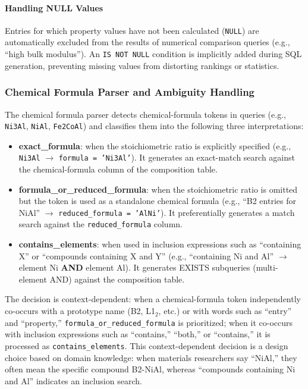 \documentclass[5p,twocolumn]{elsarticle}
\begin{document}
\paragraph{Handling NULL Values}
Entries for which property values have not been calculated (\texttt{NULL})
are automatically excluded from the results of numerical comparison queries
(e.g., ``high bulk modulus'').
An \texttt{IS NOT NULL} condition is implicitly added during SQL generation,
preventing missing values from distorting rankings or statistics.

\subsubsection{Chemical Formula Parser and Ambiguity Handling}
\label{sec:formula_parser}

The chemical formula parser detects chemical-formula tokens in queries (e.g., \texttt{Ni3Al}, \texttt{NiAl},
\texttt{Fe2CoAl}) and classifies them into the following three interpretations:

\begin{itemize}
  \item \textbf{exact\_formula}: when the stoichiometric ratio is explicitly specified
    (e.g., \texttt{Ni3Al} $\to$ \texttt{formula = 'Ni3Al'}).
    It generates an exact-match search against the chemical-formula column of the composition table.
  \item \textbf{formula\_or\_reduced\_formula}: when the stoichiometric ratio is omitted but
    the token is used as a standalone chemical formula
    (e.g., ``B2 entries for NiAl'' $\to$ \texttt{reduced\_formula = 'AlNi'}).
    It preferentially generates a match search against the \texttt{reduced\_formula} column.
  \item \textbf{contains\_elements}: when used in inclusion expressions such as
    ``containing X'' or ``compounds containing X and Y''
    (e.g., ``containing Ni and Al'' $\to$ element Ni \textbf{AND} element Al).
    It generates EXISTS subqueries (multi-element AND) against the composition table.
\end{itemize}

The decision is context-dependent: when a chemical-formula token independently co-occurs with a prototype name
(B2, L1$_2$, etc.) or with words such as ``entry'' and ``property,''
\texttt{formula\_or\_reduced\_formula} is prioritized; when it co-occurs with inclusion expressions
such as ``contains,'' ``both,'' or ``contains,'' it is processed as
\texttt{contains\_elements}.
This context-dependent decision is a design choice based on domain knowledge:
when materials researchers say ``NiAl,'' they often mean the specific compound B2-NiAl,
whereas ``compounds containing Ni and Al'' indicates an inclusion search.
\end{document}
